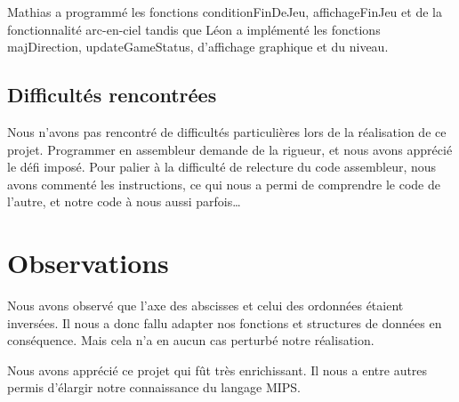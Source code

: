 \documentclass[a4paper]{article}
\begin{document}
Mathias a programmé les fonctions conditionFinDeJeu, affichageFinJeu et de la fonctionnalité arc-en-ciel tandis que Léon a implémenté les fonctions majDirection, 
updateGameStatus, d’affichage graphique et du niveau.

\subsection{Difficultés rencontrées}
Nous n'avons pas rencontré de difficultés particulières lors de la réalisation de ce projet. Programmer en assembleur demande de la rigueur, 
et nous avons apprécié le défi imposé.
Pour palier à la difficulté de relecture du code assembleur, nous avons commenté les instructions, ce qui nous a permi de comprendre le code de l'autre, 
et notre code à nous aussi parfois\dots

\section{Observations}
Nous avons observé que l'axe des abscisses et celui des ordonnées étaient inversées. Il nous a donc fallu adapter nos fonctions et structures de données en conséquence.
Mais cela n'a en aucun cas perturbé notre réalisation.

Nous avons apprécié ce projet qui fût très enrichissant. Il nous a entre autres permis d'élargir notre connaissance du langage MIPS.
\end{document}
